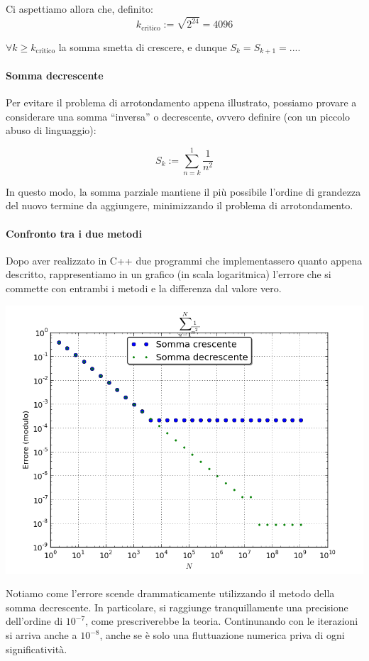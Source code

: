 \documentclass[a4paper,10pt]{article}
\begin{document}
Ci aspettiamo allora che, definito: $$k_\text{critico} := \sqrt{2^{24}} = 4096$$


$\forall k \geq k_\text{critico}$ la somma smetta di crescere, e dunque $S_k = S_{k+1} = ...$.

\paragraph{Somma decrescente}
Per evitare il problema di arrotondamento appena illustrato, possiamo provare a considerare una somma ``inversa'' o decrescente, ovvero definire (con un piccolo abuso di linguaggio):

$$S_k := \sum_{n=k}^1 \frac{1}{n^2}$$

In questo modo, la somma parziale mantiene il più possibile l'ordine di grandezza del nuovo termine da aggiungere, minimizzando il problema di arrotondamento.

\paragraph{Confronto tra i due metodi}
Dopo aver realizzato in C++ due programmi che implementassero quanto appena descritto, rappresentiamo in un grafico (in scala logaritmica) l'errore che si commette con entrambi i metodi e la differenza dal valore vero.
\begin{center}
\includegraphics[scale=.55]{../images/serie.png}
\end{center}

Notiamo come l'errore scende drammaticamente utilizzando il metodo della somma decrescente. In particolare, si raggiunge tranquillamente una precisione dell'ordine di $10^{-7}$, come prescriverebbe la teoria. Continunando con le iterazioni si arriva anche a $10^{-8}$, anche se è solo una fluttuazione numerica priva di ogni significatività.
\end{document}
